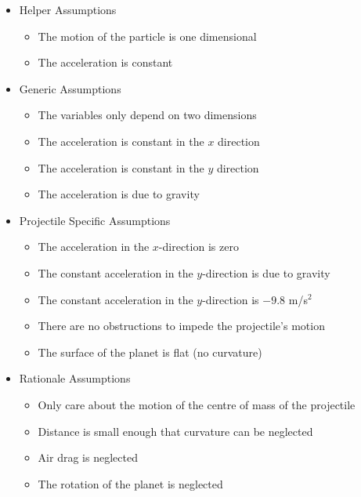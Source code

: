 \documentclass{beamer}
\begin{document}
\begin{frame}[allowframebreaks]
\begin{itemize}
\item Helper Assumptions
\begin{itemize}
  \item The motion of the particle is one dimensional
  \item The acceleration is constant
\end{itemize}
\item Generic Assumptions
\begin{itemize}
  \item The variables only depend on two dimensions
  \item The acceleration is constant in the $x$ direction
  \item The acceleration is constant in the $y$ direction
  \item The acceleration is due to gravity
\end{itemize}
\item Projectile Specific Assumptions
\begin{itemize}
  \item The acceleration in the $x$-direction is zero
  \item The constant acceleration in the $y$-direction is due to gravity
  \item The constant acceleration in the $y$-direction is $-9.8$ m/s$^2$
  \item There are no obstructions to impede the projectile's motion
  \item The surface of the planet is flat (no curvature)
\end{itemize}
\item Rationale Assumptions
\begin{itemize}
  \item Only care about the motion of the centre of mass of the projectile
  \item Distance is small enough that curvature can be neglected
  \item Air drag is neglected
  \item The rotation of the planet is neglected
\end{itemize}
\end{itemize}

\end{frame}
\end{document}
